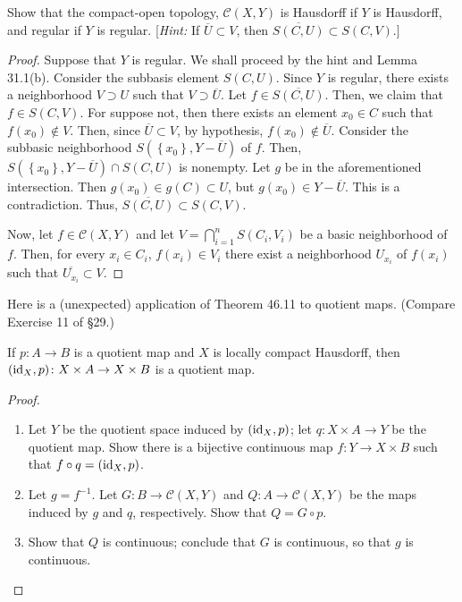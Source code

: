 \begin{problem}[Munkres \S46, Ex.\,6]
Show that the compact-open topology, $\mathcal{C}(X,Y)$ is
Hausdorff if $Y$ is Hausdorff, and regular if $Y$ is
regular. [\emph{Hint:} If $\overline U\subset V$, then
$\overline{S(C,U)}\subset S(C,V)$.]
\end{problem}
\begin{proof}
Suppose that $Y$ is regular. We shall proceed by the
hint and Lemma 31.1(b). Consider the subbasis element
$S(C,U)$. Since $Y$ is regular, there exists a neighborhood
$V\supset U$ such that $V\supset\overline{U}$. Let
$f\in\overline{S(C,U)}$. Then, we claim that $f\in S(C,V)$. For
suppose not, then there exists an element $x_0\in C$ such that
$f(x_0)\notin V$. Then, since $\overline{U}\subset V$, by
hypothesis, $f(x_0)\notin\overline{U}$. Consider the subbasic
neighborhood $S\left(\left\{x_0\right\},Y-\overline{U}\right)$ of
$f$. Then, $S\left(\left\{x_0\right\},Y-\overline{U}\right)\cap
S(C,U)$ is nonempty. Let $g$ be in the aforementioned
intersection. Then $g(x_0)\in g(C)\subset U$, but $g(x_0)\in
Y-\overline{U}$. This is a contradiction. Thus, $\overline{S(C,U)}\subset
S(C,V)$.

Now, let $f\in\mathcal{C}(X,Y)$ and let $V=\bigcap_{i=1}^n S(C_i,V_i)$ be a
basic neighborhood of $f$. Then, for every $x_i\in C_i$, $f(x_i)\in V_i$
there exist a neighborhood $U_{x_i}$ of $f(x_i)$ such that
$\overline{U_{x_i}}\subset V$.
\end{proof}
\newpage
\begin{problem}[Munkres \S46, Ex.\,9(a,b,c)]
Here is a (unexpected) application of Theorem 46.11 to quotient
maps. (Compare Exercise 11 of \S29.)
\begin{theorem*}
If $p\colon A\to B$ is a quotient map and $X$ is locally compact
Hausdorff, then $(\operatorname{id}_X,p)\colon X\times A\to X\times B$ is a
quotient map.
\begin{proof}
\renewcommand\qedsymbol{\null}
\begin{enumerate}[label=(\alph*)]
\item Let $Y$ be the quotient space induced by $(\operatorname{id}_X,p)$; let
  $q\colon X\times A\to Y$ be the quotient map. Show there is a
  bijective continuous map $f\colon Y\to X\times B$ such that
  $f\circ q=(\operatorname{id}_X,p)$.
\item Let $g=f^{-1}$. Let $G\colon B\to\mathcal{C}(X,Y)$ and
  $Q\colon A\to\mathcal{C}(X,Y)$ be the maps induced by $g$ and
  $q$, respectively. Show that $Q=G\circ p$.
\item Show that $Q$ is continuous; conclude that $G$ is
  continuous, so that $g$ is continuous.
\end{enumerate}
\end{proof}
\end{theorem*}
\end{problem}
